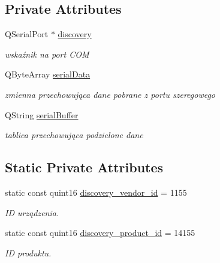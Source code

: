 \subsection*{Private Attributes}
\begin{DoxyCompactItemize}
\item 
\mbox{\label{classDialog_a7a5a966705f13033597b6e40b4bc66a1}} 
Q\+Serial\+Port $\ast$ \hyperlink{classDialog_a7a5a966705f13033597b6e40b4bc66a1}{discovery}
\begin{DoxyCompactList}\small\item\em wskaźnik na port C\+OM \end{DoxyCompactList}\item 
\mbox{\label{classDialog_a2f4d0b4d440bbc32668af9886220ddc7}} 
Q\+Byte\+Array \hyperlink{classDialog_a2f4d0b4d440bbc32668af9886220ddc7}{serial\+Data}
\begin{DoxyCompactList}\small\item\em zmienna przechowująca dane pobrane z portu szeregowego \end{DoxyCompactList}\item 
\mbox{\label{classDialog_ac1227694c4e6d36bd406360dae0cb7bc}} 
Q\+String \hyperlink{classDialog_ac1227694c4e6d36bd406360dae0cb7bc}{serial\+Buffer}
\begin{DoxyCompactList}\small\item\em tablica przechowująca podzielone dane \end{DoxyCompactList}\end{DoxyCompactItemize}
\subsection*{Static Private Attributes}
\begin{DoxyCompactItemize}
\item 
\mbox{\label{classDialog_aff6a46c0884ecc1e95fd9c7375aec514}} 
static const quint16 \hyperlink{classDialog_aff6a46c0884ecc1e95fd9c7375aec514}{discovery\+\_\+vendor\+\_\+id} = 1155
\begin{DoxyCompactList}\small\item\em ID urządzenia. \end{DoxyCompactList}\item 
\mbox{\label{classDialog_a97e001dff4a03fc6e4d63a5a0fa7b8f1}} 
static const quint16 \hyperlink{classDialog_a97e001dff4a03fc6e4d63a5a0fa7b8f1}{discovery\+\_\+product\+\_\+id} = 14155
\begin{DoxyCompactList}\small\item\em ID produktu. \end{DoxyCompactList}\end{DoxyCompactItemize}


